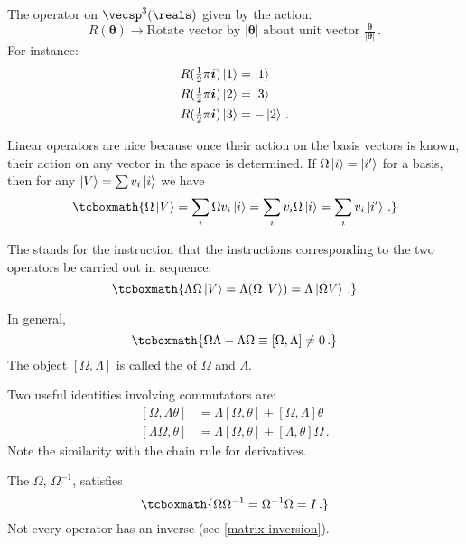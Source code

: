 \begin{example}
The operator on $\vecsp^3(\reals)$ given by the action:
\[ R(\bm{\theta}) \rightarrow \text{Rotate vector by } |\bm{\theta}| \text{ about unit vector } \tfrac{\bm{\theta}}{|\bm{\theta}|}\,.\]
For instance:
\begin{align}
    R(\tfrac{1}{2}\pi \bm{i})\ket{1} &= \ket{1} \label{rotate by pi/2}\\
    R(\tfrac{1}{2}\pi \bm{i})\ket{2} &= \ket{3} \\
    R(\tfrac{1}{2}\pi \bm{i})\ket{3} &= -\ket{2}\,.
\end{align}
\end{example}

Linear operators are nice because once their action on the basis vectors is known, their action on any vector in the space is determined. If $\Omega\ket{i} = \ket{i'}$ for a basis, then for any $\ket{V} = \sum v_i \ket{i}$ we have
\begin{equation}\label{linear operator action on arbitrary vector}
    \tcboxmath{\Omega\ket{V} = \sum_i \Omega v_i\ket{i} = \sum_i v_i \Omega\ket{i} = \sum_i v_i\ket{i'}\,.}
\end{equation}

The  stands for the instruction that the instructions corresponding to the two operators be carried out in sequence:
\begin{equation}\label{operator product}
    \tcboxmath{\Lambda\Omega\ket{V} = \Lambda(\Omega\ket{V}) = \Lambda\ket{\Omega V}\,.}
\end{equation}

In general,
\begin{equation}\label{commutator}
    \tcboxmath{\Omega\Lambda - \Lambda\Omega \equiv [\Omega, \Lambda] \neq 0\,.}
\end{equation}
The object $[\Omega, \Lambda]$ is called the  of $\Omega$ and $\Lambda$.

Two useful identities involving commutators are:
\begin{align}\label{commutator identities}
    [\Omega, \Lambda \theta] &= \Lambda[\Omega, \theta] + [\Omega, \Lambda]\theta \\
    [\Lambda \Omega, \theta] &= \Lambda[\Omega, \theta] + [\Lambda, \theta]\Omega\,. 
\end{align}
Note the similarity with the chain rule for derivatives.

The  $\Omega$, $\Omega^{-1}$, satisfies
\begin{equation}\label{operator inverse}
    \tcboxmath{\Omega\Omega^{-1} = \Omega^{-1}\Omega = I\,.}
\end{equation}
Not every operator has an inverse (see \eqref{matrix inversion}).

